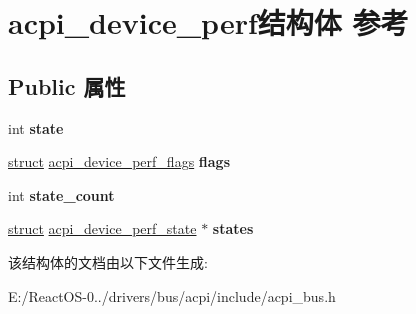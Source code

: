 \hypertarget{structacpi__device__perf}{}\section{acpi\+\_\+device\+\_\+perf结构体 参考}
\label{structacpi__device__perf}
\subsection*{Public 属性}
\begin{DoxyCompactItemize}
\item 
\mbox{\label{structacpi__device__perf_a6f0619318d3e6d1114b50fbce2c949d0}} 
int {\bfseries state}
\item 
\mbox{\label{structacpi__device__perf_a508f5fab09be2fa9d562d68a1f451e19}} 
\hyperlink{interfacestruct}{struct} \hyperlink{structacpi__device__perf__flags}{acpi\+\_\+device\+\_\+perf\+\_\+flags} {\bfseries flags}
\item 
\mbox{\label{structacpi__device__perf_af25c8d1f4d2fe982501d5a37e6b1a1b1}} 
int {\bfseries state\+\_\+count}
\item 
\mbox{\label{structacpi__device__perf_a889c9a47f92b0de0c5b2ef00a459c5f9}} 
\hyperlink{interfacestruct}{struct} \hyperlink{structacpi__device__perf__state}{acpi\+\_\+device\+\_\+perf\+\_\+state} $\ast$ {\bfseries states}
\end{DoxyCompactItemize}


该结构体的文档由以下文件生成\+:\begin{DoxyCompactItemize}
\item 
E\+:/\+React\+O\+S-\/0../drivers/bus/acpi/include/acpi\+\_\+bus.\+h\end{DoxyCompactItemize}
